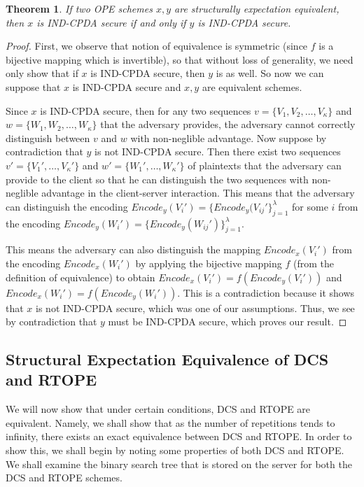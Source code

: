 \documentclass[12pt]{article}
\newtheorem{theorem}{Theorem}[section]
\begin{document}
\begin{theorem}
 If two OPE schemes $x,y$ are structurally expectation equivalent, then $x$ is IND-CPDA secure if and only if $y$ is IND-CPDA secure.
\end{theorem}
\begin{proof}
  First, we observe that notion of equivalence is symmetric (since $f$ is a bijective mapping which is invertible), so that without loss of generality, we need only show that if $x$ is IND-CPDA secure, then $y$ is as well. So now we can suppose that $x$ is IND-CPDA secure and $x,y$ are equivalent schemes.

  Since $x$ is IND-CPDA secure, then for any two sequences $v = \{V_1, V_2, \ldots, V_{\kappa}\}$ and $w = \{W_1, W_2, \ldots, W_{\kappa} \}$ that the adversary provides, the adversary cannot correctly distinguish between $v$ and $w$ with non-neglible advantage. Now suppose by contradiction that $y$ is not IND-CPDA secure. Then there exist two sequences $v' = \{V_1', \ldots, V_{\kappa}'\}$ and $w' = \{W_1', \ldots, W_{\kappa}'\}$ of plaintexts that the adversary can provide to the client so that he can distinguish the two sequences with non-neglible advantage in the client-server interaction. This means that the adversary can distinguish the encoding $Encode_y(V_i') = \{Encode_y(V_{ij}' \}_{j=1}^{\lambda}$ for some $i$ from the encoding $Encode_y(W_i') = \{Encode_y(W_{ij}') \}_{j=1}^{\lambda}$.

  This means the adversary can also distinguish the mapping $Encode_x(V_i')$ from the encoding $Encode_x(W_i')$ by applying the bijective mapping $f$ (from the definition of equivalence) to obtain $Encode_x(V_i') = f(Encode_y(V_i'))$ and $Encode_x(W_i') = f(Encode_y(W_i'))$. This is a contradiction because it shows that $x$ is not IND-CPDA secure, which was one of our assumptions. Thus, we see by contradiction that $y$ must be IND-CPDA secure, which proves our result.
\end{proof}

  \subsection{Structural Expectation Equivalence of DCS and RTOPE}

We will now show that under certain conditions, DCS and RTOPE are equivalent. Namely, we shall show that as the number of repetitions tends to infinity, there exists an exact equivalence between DCS and RTOPE. In order to show this, we shall begin by noting some properties of both DCS and RTOPE. We shall examine the binary search tree that is stored on the server for both the DCS and RTOPE schemes. 
\end{document}

